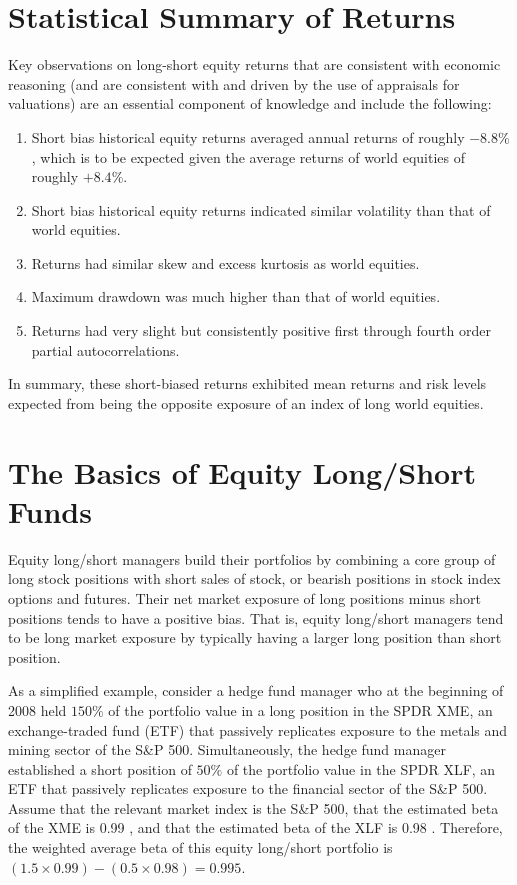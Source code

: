 \documentclass[11pt]{article}
\begin{document}
\section*{Statistical Summary of Returns}
Key observations on long-short equity returns that are consistent with economic reasoning (and are consistent with and driven by the use of appraisals for valuations) are an essential component of knowledge and include the following:

\begin{enumerate}
  \item Short bias historical equity returns averaged annual returns of roughly $-8.8 \%$, which is to be expected given the average returns of world equities of roughly $+8.4 \%$.

  \item Short bias historical equity returns indicated similar volatility than that of world equities.

  \item Returns had similar skew and excess kurtosis as world equities.

  \item Maximum drawdown was much higher than that of world equities.

  \item Returns had very slight but consistently positive first through fourth order partial autocorrelations.

\end{enumerate}

In summary, these short-biased returns exhibited mean returns and risk levels expected from being the opposite exposure of an index of long world equities.

\section*{The Basics of Equity Long/Short Funds}
Equity long/short managers build their portfolios by combining a core group of long stock positions with short sales of stock, or bearish positions in stock index options and futures. Their net market exposure of long positions minus short positions tends to have a positive bias. That is, equity long/short managers tend to be long market exposure by typically having a larger long position than short position.

As a simplified example, consider a hedge fund manager who at the beginning of 2008 held $150 \%$ of the portfolio value in a long position in the SPDR XME, an exchange-traded fund (ETF) that passively replicates exposure to the metals and mining sector of the S\&P 500. Simultaneously, the hedge fund manager established a short position of $50 \%$ of the portfolio value in the SPDR XLF, an ETF that passively replicates exposure to the financial sector of the S\&P 500. Assume that the relevant market index is the S\&P 500, that the estimated beta of the XME is 0.99 , and that the estimated beta of the XLF is 0.98 . Therefore, the weighted average beta of this equity long/short portfolio is $(1.5 \times 0.99)-(0.5 \times 0.98)=0.995$.
\end{document}
